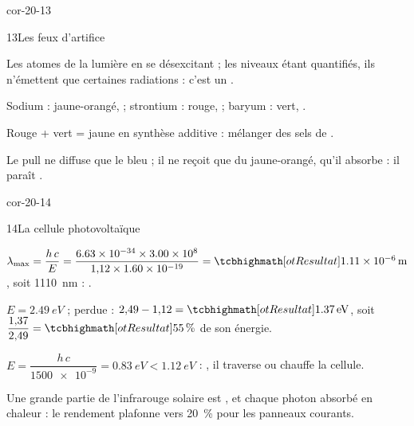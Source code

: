 \begin{blocLivre}{cor-20-13}
\begin{corrige}{13}{Les feux d'artifice}
\begin{questions}
\item Les atomes  de la lumière en se désexcitant ; les niveaux étant quantifiés, ils n'émettent que certaines
radiations : c'est un .
\item Sodium : jaune-orangé,  ; strontium : rouge,  ; baryum : vert, .
\item Rouge + vert = jaune en synthèse additive : mélanger des sels de .
\item Le pull ne diffuse que le bleu ; il ne reçoit que du jaune-orangé, qu'il absorbe : il paraît .
\end{questions}
\end{corrige}
\end{blocLivre}
\begin{blocLivre}{cor-20-14}
\begin{corrige}{14}{La cellule photovoltaïque}
\begin{questions}
\item $\lambda_\text{max}=\dfrac{h\,c}{E}=\dfrac{\num{6,63e-34}\times\num{3,00e8}}{1{,}12\times\num{1,60e-19}}=\res{\qty{1,11e-6}{m}}$, soit \qty{1110}{nm} : .
\item $E=\qty{2,49}{eV}$ ; perdue : $2{,}49-1{,}12=\res{\qty{1,37}{eV}}$, soit $\dfrac{1{,}37}{2{,}49}=\res{\qty{55}{\percent}}$ de son énergie.
\item $E=\dfrac{h\,c}{\num{1500e-9}}=\qty{0,83}{eV}<\qty{1,12}{eV}$ : , il traverse ou chauffe la cellule.
\item Une grande partie de l'infrarouge solaire est , et chaque photon absorbé  en chaleur : le
rendement plafonne vers \qty{20}{\percent} pour les panneaux courants.
\end{questions}
\end{corrige}
\end{blocLivre}
